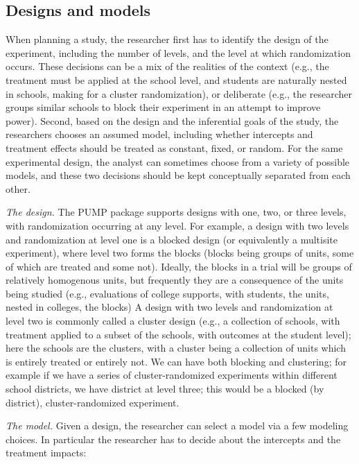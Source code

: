\documentclass[
]{article}
\begin{document}
\subsection{Designs and models}
\label{sec:d_m}

When planning a study, the researcher first has to identify the design
of the experiment, including the number of levels, and the level at
which randomization occurs. These decisions can be a mix of the
realities of the context (e.g., the treatment must be applied at the
school level, and students are naturally nested in schools, making for a
cluster randomization), or deliberate (e.g., the researcher groups
similar schools to block their experiment in an attempt to improve
power). Second, based on the design and the inferential goals of the
study, the researchers chooses an assumed model, including whether
intercepts and treatment effects should be treated as constant, fixed,
or random. For the same experimental design, the analyst can sometimes
choose from a variety of possible models, and these two decisions should
be kept conceptually separated from each other.

\emph{The design.} The PUMP package supports designs with one, two, or
three levels, with randomization occurring at any level. For example, a
design with two levels and randomization at level one is a blocked
design (or equivalently a multisite experiment), where level two forms
the blocks (blocks being groups of units, some of which are treated and
some not). Ideally, the blocks in a trial will be groups of relatively
homogenous units, but frequently they are a consequence of the units
being studied (e.g., evaluations of college supports, with students, the
units, nested in colleges, the blocks) A design with two levels and
randomization at level two is commonly called a cluster design (e.g., a
collection of schools, with treatment applied to a subset of the
schools, with outcomes at the student level); here the schools are the
clusters, with a cluster being a collection of units which is entirely
treated or entirely not. We can have both blocking and clustering; for
example if we have a series of cluster-randomized experiments within
different school districts, we have district at level three; this would
be a blocked (by district), cluster-randomized experiment.

\emph{The model.} Given a design, the researcher can select a model via
a few modeling choices. In particular the researcher has to decide about
the intercepts and the treatment impacts:
\end{document}
